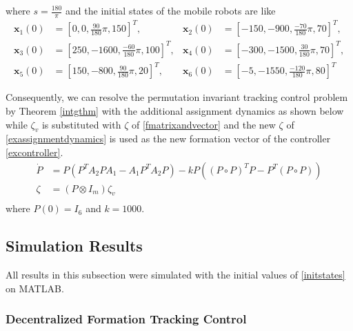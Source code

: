 \documentclass[11pt, a4paper, oneside, openany, reqno]{book}
\theoremstyle{definition}
\theoremstyle{remark}
\numberwithin{equation}{chapter} %
\newcommand{\x}{\textbf{x}}
\begin{document}
where $ s=\frac{180}{\pi}$ and the initial states of the mobile robots are like
\begin{equation}\begin{alignat*}{3}\label{initstates}
	\x_{1}(0)&=\left[ 0, 0, \frac{90}{180} \pi, 150 \right]^T, 
	&\x_{2}(0)&=\left[ -150, -900, \frac{-70}{180} \pi, 70 \right]^T, \\
	\x_{3}(0)&=\left[ 250, -1600, \frac{-60}{180} \pi, 100 \right]^T, 
	&\x_{4}(0)&=\left[ -300, -1500, \frac{30}{180} \pi, 70 \right]^T, \\
	\x_{5}(0)&=\left[ 150, -800, \frac{90}{180} \pi, 20 \right]^T, 
	&\x_{6}(0)&=\left[ -5, -1550, \frac{-120}{180} \pi, 80 \right]^T 
\end{alignat*}\end{equation}

Consequently, we can resolve the permutation invariant tracking control problem by Theorem \ref{intgthm}
with the additional assignment dynamics as shown below 
while $ \zeta_v $ is substituted with $ \zeta $ of \eqref{fmatrixandvector}
and the new $ \zeta $ of \eqref{exassignmentdynamics} is used as 
the new formation vector of the controller \eqref{excontroller}.
\begin{equation}\begin{split}\label{exassignmentdynamics}
	\dot{P} &= P \left( P^T A_2 P A_1 - A_1 P^T A_2 P \right)
				-k P \left( (P \circ P)^T P -P^T (P \circ P) \right) \\
	\zeta &= \left( P \otimes I_m \right) \zeta_v \\
\end{split}\end{equation}
where $ P(0)=I_6 $ and $ k=1000 $.

\subsection{Simulation Results}
All results in this subsection were simulated with the initial values of \eqref{initstates} on MATLAB.

\subsubsection{Decentralized Formation Tracking Control}
\end{document}
